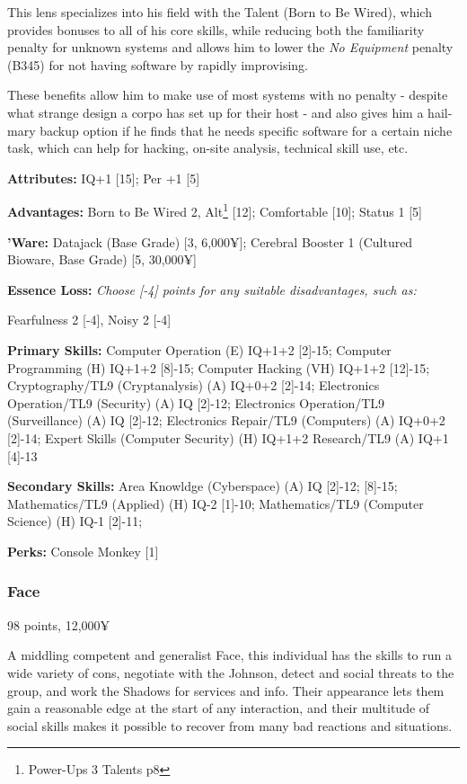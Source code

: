 \begin{multicols*}{2}
	This lens specializes into his field with the Talent (Born to Be Wired), which provides bonuses to all of his core skills, while reducing both the familiarity penalty for unknown systems and allows him to lower the \textit{No Equipment} penalty (B345) for not having software by rapidly improvising. 
	
	These benefits allow him to make use of most systems with no penalty - despite what strange design a corpo has set up for their host - and also gives him a hail-mary backup option if he finds that he needs specific software for a certain niche task, which can help for hacking, on-site analysis, technical skill use, etc.
	
	\textbf{Attributes:}
	IQ+1 [15]; Per +1 [5]
	
	\textbf{Advantages:}
	Born to Be Wired 2, Alt\footnote{Power-Ups 3 Talents p8} [12]; Comfortable [10]; Status 1 [5]
	
	\textbf{'Ware:}
	Datajack (Base Grade) [3, 6,000¥]; Cerebral Booster 1 (Cultured Bioware, Base Grade) [5, 30,000¥]
	
	\textbf{Essence Loss:}
	\textit{Choose [-4] points for any suitable disadvantages, such as:}
	
	Fearfulness 2 [-4], Noisy 2 [-4]	
	
	\textbf{Primary Skills:}
	Computer Operation (E) IQ+1+2 [2]-15; Computer Programming (H) IQ+1+2 [8]-15; Computer Hacking (VH) IQ+1+2 [12]-15; Cryptography/TL9 (Cryptanalysis) (A) IQ+0+2 [2]-14; Electronics Operation/TL9 (Security) (A) IQ [2]-12; Electronics Operation/TL9 (Surveillance) (A) IQ [2]-12; Electronics Repair/TL9 (Computers) (A) IQ+0+2 [2]-14; Expert Skills (Computer Security) (H) IQ+1+2  Research/TL9 (A) IQ+1 [4]-13
	
	\textbf{Secondary Skills:}
	Area Knowldge (Cyberspace) (A) IQ [2]-12; [8]-15; Mathematics/TL9 (Applied) (H) IQ-2 [1]-10; Mathematics/TL9 (Computer Science) (H) IQ-1 [2]-11;
	
	\textbf{Perks:}
	Console Monkey [1]
	
	\subsubsection{Face}
	\begin{flushright}
		98 points, 12,000¥
	\end{flushright}
	
	A middling competent and generalist Face, this individual has the skills to run a wide variety of cons, negotiate with the Johnson, detect and social threats to the group, and work the Shadows for services and info. Their appearance lets them gain a reasonable edge at the start of any interaction, and their multitude of social skills makes it possible to recover from many bad reactions and situations.
	

\end{multicols*}
